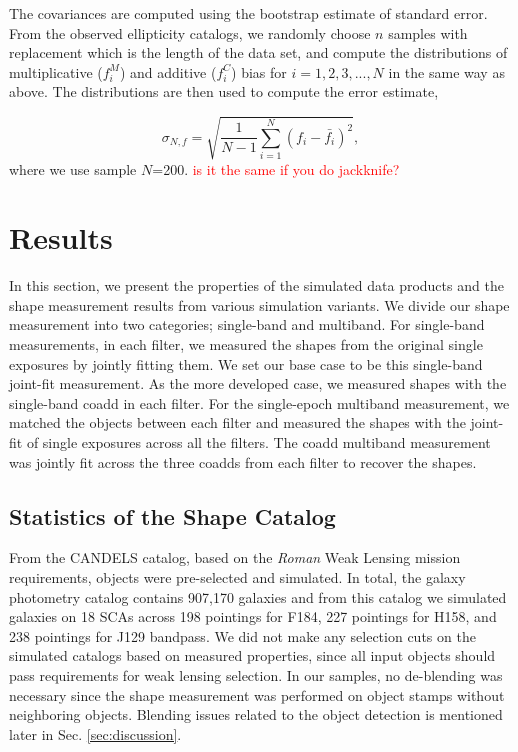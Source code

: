 \documentclass[fleqn,usenatbib]{mnras}
\begin{document}
The covariances are computed using the bootstrap estimate of standard error. From the observed ellipticity catalogs, we randomly choose $n$ samples with replacement which is the length of the data set, and compute the distributions of multiplicative ($f^{M}_{i}$) and additive ($f^{C}_{i}$) bias for $i=1,2,3,...,N$ in the same way as above. The distributions are then used to compute the error estimate,  


\begin{equation}
    \sigma_{N,f} = \sqrt{\frac{1}{N-1} \sum_{i=1}^{N}(f_{i}-\bar{f_{i}})^{2}}, 
\end{equation}
where we use sample $N$=200.  \textcolor{red}{is it the same if you do jackknife?}


\section{Results}
\label{sec:results}
In this section, we present the properties of the simulated data products and the shape measurement results from various simulation variants. We divide our shape measurement into two categories; single-band and multiband. For single-band measurements, in each filter, we measured the shapes from the original single exposures by jointly fitting them. We set our base case to be this single-band joint-fit measurement. As the more developed case, we measured shapes with the single-band coadd in each filter. For the single-epoch multiband measurement, we matched the objects between each filter and measured the shapes with the joint-fit of single exposures across all the filters. The coadd multiband measurement was jointly fit across the three coadds from each filter to recover the shapes. 

\subsection{Statistics of the Shape Catalog}
From the CANDELS catalog, based on the \emph{Roman} Weak Lensing mission requirements, objects were pre-selected and simulated. In total, the galaxy photometry catalog contains 907,170 galaxies and from this catalog we simulated galaxies on 18 SCAs across 198 pointings for F184, 227 pointings for H158, and 238 pointings for J129 bandpass. We did not make any selection cuts on the simulated catalogs based on measured properties, since all input objects should pass requirements for weak lensing selection. In our samples, no de-blending was necessary since the shape measurement was performed on object stamps without neighboring objects. Blending issues related to the object detection is mentioned later in Sec. \ref{sec:discussion}. 
\end{document}

